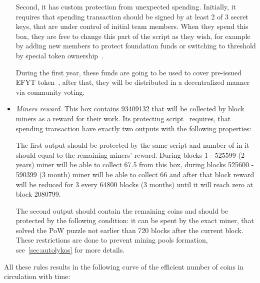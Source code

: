 \begin{itemize}
    Second, it has custom protection from unexpected spending.
    Initially, it requires that spending transaction should be signed by at least 2 of 3 secret keys,
    that are under control of initial team members. When they spend this box, they are free to
    change this part of the script as they wish, for example by adding new members to protect foundation
    funds or switching to threshold by special token ownership~\cite{link to ...}.

    During the first year, these funds are going to be used to cover pre-issued EFYT token~\cite{our website},
    after that, they will be distributed in a decentralized manner via community voting.


    \item{\em Miners reward.} This box contains 93409132 \Erg{} that will be collected by block miners
    as a reward for their work.
    Its protecting script~\cite{link to corresponding ergo tree} requires, that spending transaction
    have exactly two outputs with the following properties:


    The first output should be protected by the same script and number of \Erg{} in it should
    equal to the remaining miners' reward.
    During blocks 1 - 525599 (2 years) miner will be able to collect 67.5 \Erg{} from this box,
    during blocks 525600 - 590399 (3 month) miner will be able to collect 66 \Erg{} and after
    that block reward will be reduced for 3 \Erg{} every 64800 blocks (3 months) until it will reach zero
    at block 2080799.

    The second output should contain the remaining coins and should be protected by the following condition:
    it can be spent by the exact miner, that solved the PoW puzzle not earlier than 720 blocks after the current block.
    These restrictions are done to prevent mining pools formation, see~\ref{sec:autolykos} for more details.



\end{itemize}

All these rules results in the following curve of the efficient number of coins in circulation with time:

